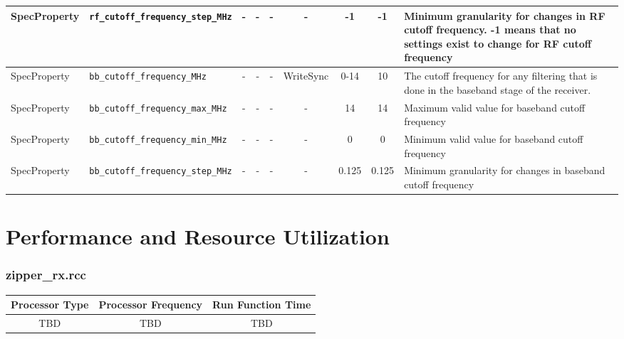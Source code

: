 \documentclass{article}
\def\comp{zipper\_rx}
\begin{document}
\begin{landscape}
\begin{scriptsize}
\begin{tabular}{|p{2cm}|p{4cm}|c|c|c|c|c|c|p{6.5cm}|}
			\hline
			SpecProperty & \verb+rf_cutoff_frequency_step_MHz+ & -    & -        & -          & -              & -1          & -1     & Minimum granularity for changes in RF cutoff frequency.  -1 means that no settings exist to change for RF cutoff frequency                                                                                                                                                                      \\
			\hline
			SpecProperty & \verb+bb_cutoff_frequency_MHz+      & -    & -        & -          & WriteSync      & 0-14         & 10      & The cutoff frequency for any filtering that is done in the baseband stage of the receiver.                                                                                                                                  \\
			\hline
			SpecProperty & \verb+bb_cutoff_frequency_max_MHz+  & -    & -        & -          & -              & 14           & 14      & Maximum valid value for baseband cutoff frequency                                                                                                                                                                           \\
			\hline
			SpecProperty & \verb+bb_cutoff_frequency_min_MHz+  & -    & -        & -          & -              & 0            & 0       & Minimum valid value for baseband cutoff frequency                                                                                                                                                                           \\
			\hline
			SpecProperty & \verb+bb_cutoff_frequency_step_MHz+ & -    & -        & -          & -              & 0.125        & 0.125   & Minimum granularity for changes in baseband cutoff frequency                                                                                                                                                                \\
			\hline
		\end{tabular}
	\end{scriptsize}
\end{landscape}

\section*{Performance and Resource Utilization}
\subsubsection*{\comp.rcc}
\begin{scriptsize}
	\begin{tabular}{|c|c|c|}
		\hline
		\rowcolor{blue}
		Processor Type & Processor Frequency & Run Function Time \\
		\hline
		TBD            & TBD                 & TBD               \\
		\hline
	\end{tabular}
\end{scriptsize}
\end{document}
